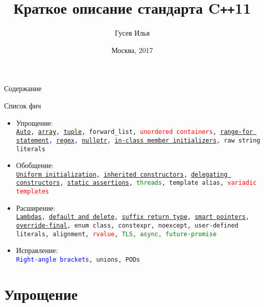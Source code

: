 \documentclass[10pt]{beamer}
\title[\href{https://goo.gl/NRgp8K}{https://goo.gl/NRgp8K} (Term 3)]{Краткое описание стандарта C\texttt{++}11}
\author[Гусев Илья]{Гусев Илья}
\institute[МФТИ] 
{Московский физико-технический институт\\*}
\date{Москва, 2017}
\begin{document}
\begin{frame}
  \titlepage
\end{frame}

\begin{frame}{Содержание}
\begin{multicols}{2}
\tableofcontents
\end{multicols}
\end{frame}

\begin{frame}{Список фич}
\begin{itemize}
\item{Упрощение:\\ \texttt{\textcolor{blue}{\hyperlink{Auto}{Auto}, \hyperlink{Array}{array}, \hyperlink{Tuple}{tuple},} forward\_list, \textcolor{red}{unordered containers}, \textcolor{blue}{\hyperlink{Range-for}{range-for statement}, \hyperlink{Regex}{regex}, \hyperlink{Nullptr}{nullptr}, \hyperlink{In-class member initializers}{in-class member initializers}}, raw string literals }}
\item{Обобщение:\\ \texttt{\textcolor{blue}{\hyperlink{Uniform initialization}{Uniform initialization}, \hyperlink{Inherited constructors}{inherited constructors}, \hyperlink{Delegating constructors}{delegating constructors}, \hyperlink{Static assertions}{static assertions}}, \textcolor{green}{threads}, template alias, \textcolor{red}{variadic templates}}}
\item{Расширение:\\ \texttt{\textcolor{blue}{\hyperlink{Lambdas}{Lambdas}, \hyperlink{Default and delete}{default and delete}, \hyperlink{Suffix return type}{suffix return type}, \hyperlink{Smart pointers}{smart pointers}, \hyperlink{Override-final}{override-final}}, enum class, constexpr, noexcept, user-defined literals, alignment, \textcolor{red}{rvalue}, \textcolor{green}{TLS, async, future-promise}}}
\item{Исправление:\\ \texttt{\textcolor{blue}{Right-angle brackets}, unions, PODs}}
\end{itemize}
\end{frame}

\section{Упрощение}
\end{document}

